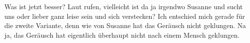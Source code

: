 
Was ist jetzt besser? Laut rufen, vielleicht ist da ja irgendwo Susanne und sucht uns oder lieber ganz leise sein und sich verstecken? Ich entschied mich gerade für die zweite Variante, denn wie von Susanne hat das Geräusch nicht geklungen. Na ja, das Geräusch hat eigentlich überhaupt nicht nach einem Mensch geklungen.

